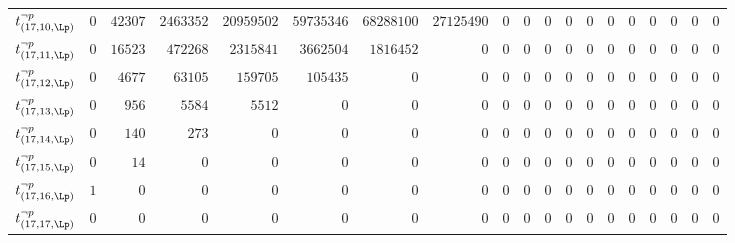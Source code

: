 \begin{tabular}{r|rrrrrrrrrrrrrrrrrr}
  $t^{\neg p}_{(17,10,\Lp)}$ & $0$ & $42307$ & $2463352$ & $20959502$ & $59735346$ & $68288100$ & $27125490$ & $0$ & $0$ & $0$ & $0$ & $0$ & $0$ & $0$ & $0$ & $0$ & $0$ & $0$ \\
  $t^{\neg p}_{(17,11,\Lp)}$ & $0$ & $16523$ & $472268$ & $2315841$ & $3662504$ & $1816452$ & $0$ & $0$ & $0$ & $0$ & $0$ & $0$ & $0$ & $0$ & $0$ & $0$ & $0$ & $0$ \\
  $t^{\neg p}_{(17,12,\Lp)}$ & $0$ & $4677$ & $63105$ & $159705$ & $105435$ & $0$ & $0$ & $0$ & $0$ & $0$ & $0$ & $0$ & $0$ & $0$ & $0$ & $0$ & $0$ & $0$ \\
  $t^{\neg p}_{(17,13,\Lp)}$ & $0$ & $956$ & $5584$ & $5512$ & $0$ & $0$ & $0$ & $0$ & $0$ & $0$ & $0$ & $0$ & $0$ & $0$ & $0$ & $0$ & $0$ & $0$ \\
  $t^{\neg p}_{(17,14,\Lp)}$ & $0$ & $140$ & $273$ & $0$ & $0$ & $0$ & $0$ & $0$ & $0$ & $0$ & $0$ & $0$ & $0$ & $0$ & $0$ & $0$ & $0$ & $0$ \\
  $t^{\neg p}_{(17,15,\Lp)}$ & $0$ & $14$ & $0$ & $0$ & $0$ & $0$ & $0$ & $0$ & $0$ & $0$ & $0$ & $0$ & $0$ & $0$ & $0$ & $0$ & $0$ & $0$ \\
  $t^{\neg p}_{(17,16,\Lp)}$ & $1$ & $0$ & $0$ & $0$ & $0$ & $0$ & $0$ & $0$ & $0$ & $0$ & $0$ & $0$ & $0$ & $0$ & $0$ & $0$ & $0$ & $0$ \\
  $t^{\neg p}_{(17,17,\Lp)}$ & $0$ & $0$ & $0$ & $0$ & $0$ & $0$ & $0$ & $0$ & $0$ & $0$ & $0$ & $0$ & $0$ & $0$ & $0$ & $0$ & $0$ & $0$ \\
\end{tabular}
